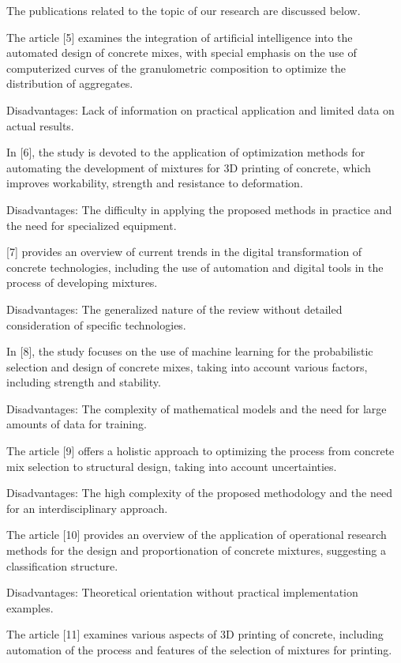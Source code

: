 {The publications related to the topic of our research are discussed
below.

The article {[}5{]} examines the integration of artificial intelligence
into the automated design of concrete mixes, with special emphasis on
the use of computerized curves of the granulometric composition to
optimize the distribution of aggregates.

Disadvantages: Lack of information on practical application and limited
data on actual results.

In {[}6{]}, the study is devoted to the application of optimization
methods for automating the development of mixtures for 3D printing of
concrete, which improves workability, strength and resistance to
deformation.

Disadvantages: The difficulty in applying the proposed methods in
practice and the need for specialized equipment.

{[}7{]} provides an overview of current trends in the digital
transformation of concrete technologies, including the use of automation
and digital tools in the process of developing mixtures.

Disadvantages: The generalized nature of the review without detailed
consideration of specific technologies.

In {[}8{]}, the study focuses on the use of machine learning for the
probabilistic selection and design of concrete mixes, taking into
account various factors, including strength and stability.

Disadvantages: The complexity of mathematical models and the need for
large amounts of data for training.

The article {[}9{]} offers a holistic approach to optimizing the process
from concrete mix selection to structural design, taking into account
uncertainties.

Disadvantages: The high complexity of the proposed methodology and the
need for an interdisciplinary approach.

The article {[}10{]} provides an overview of the application of
operational research methods for the design and proportionation of
concrete mixtures, suggesting a classification structure.

Disadvantages: Theoretical orientation without practical implementation
examples.

The article {[}11{]} examines various aspects of 3D printing of
concrete, including automation of the process and features of the
selection of mixtures for printing.

}
